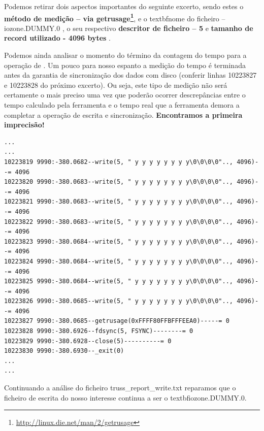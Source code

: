 \documentclass[a4paper]{article}
\begin{document}
{Podemos retirar dois aspectos importantes do seguinte excerto, sendo estes o \textbf{método de medição -- via getrusage\footnote{\url{http://linux.die.net/man/2/getrusage}}},  e o textbf{nome do ficheiro -- iozone.DUMMY.0} , o seu respectivo \textbf{descritor de ficheiro  -- 5}  e \textbf{ tamanho de record utilizado - 4096 bytes }.\par 
Podemos ainda analisar o momento do término da contagem do tempo para a operação de . Um pouco para nosso espanto a medição do tempo é terminada antes da garantia de sincronização dos dados com disco (conferir linhas 10223827 e 10223828 do próximo excerto). Ou seja, este tipo de medição não será certamente o mais preciso uma vez que poderão ocorrer descrepâncias entre o tempo calculado pela ferramenta e o tempo real que a ferramenta demora a completar a operação de escrita e sincronização. \textbf{Encontramos a primeira imprecisão!}
\begin{lstlisting}
...
...
10223819 9990:-380.0682--write(5, " y y y y y y y y\0\0\0\0".., 4096)--= 4096
10223820 9990:-380.0683--write(5, " y y y y y y y y\0\0\0\0".., 4096)--= 4096
10223821 9990:-380.0683--write(5, " y y y y y y y y\0\0\0\0".., 4096)--= 4096
10223822 9990:-380.0683--write(5, " y y y y y y y y\0\0\0\0".., 4096)--= 4096
10223823 9990:-380.0684--write(5, " y y y y y y y y\0\0\0\0".., 4096)--= 4096
10223824 9990:-380.0684--write(5, " y y y y y y y y\0\0\0\0".., 4096)--= 4096
10223825 9990:-380.0684--write(5, " y y y y y y y y\0\0\0\0".., 4096)--= 4096
10223826 9990:-380.0685--write(5, " y y y y y y y y\0\0\0\0".., 4096)--= 4096
10223827 9990:-380.0685--getrusage(0xFFFF80FFBFFFEEA0)-----= 0
10223828 9990:-380.6926--fdsync(5, FSYNC)--------= 0
10223829 9990:-380.6928--close(5)----------= 0
10223830 9990:-380.6930--_exit(0)
...
...
\end{lstlisting}

Continuando a análise do ficheiro truss\_report\_write.txt reparamos que o ficheiro de escrita do nosso interesse continua a ser o textbf{iozone.DUMMY.0}.


}
\end{document}
